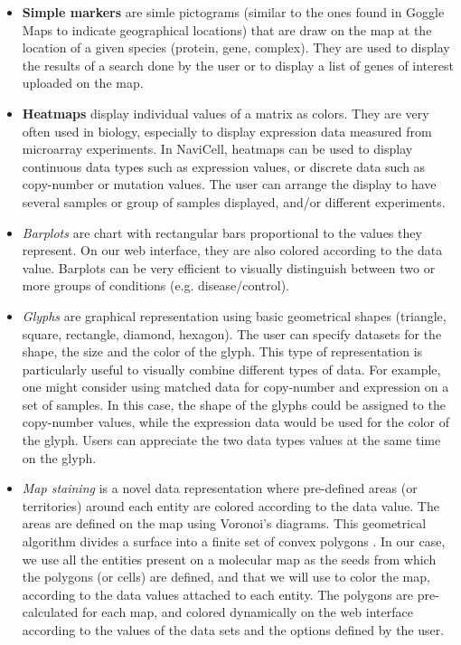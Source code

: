 \documentclass[a4,center,fleqn]{NAR}
\begin{document}
\begin{itemize}

\item \textbf{Simple markers} are simle pictograms (similar to the ones found in Goggle Maps
to indicate geographical locations) that are draw on the map at the location
of a given species (protein, gene, complex). They are used to display the
results of a search done by the user or to display a list of genes of interest
uploaded on the map.

\item \textbf{Heatmaps} display individual values of a matrix as
colors. They are very often used in biology, especially to display expression
data measured from microarray experiments. In NaviCell, heatmaps can be used to
display continuous data types such as expression values, or discrete data such
as copy-number or mutation values. The user can arrange the display to have
several samples or group of samples displayed, and/or different experiments. 

\item \emph{Barplots} are chart with rectangular bars proportional to the values
they represent. On our web interface, they are also colored according to the
data value. Barplots can be very efficient to visually distinguish between two
or more groups of conditions (e.g. disease/control).  

\item \emph{Glyphs} are graphical representation using basic geometrical shapes
(triangle, square, rectangle, diamond, hexagon). The user can specify datasets
for the shape, the size and the color of the glyph. This type of representation
is particularly useful to visually combine different types of data. For
example, one might consider using matched data for copy-number and expression
on a set of samples. In this case, the shape of the glyphs could be assigned to
the copy-number values, while the expression data would be used for the color of
the glyph. Users can appreciate the two data types values at the same time on
the glyph.

\item \emph{Map staining} is a novel data representation where pre-defined areas
(or territories) around each entity are colored according to the data value. The
areas are defined on the map using Voronoi's diagrams. This geometrical
algorithm divides a surface into a finite set of convex polygons
\cite{aurenhammer1991voronoi}. In our case, we use all the entities present on a
molecular map as the seeds from which the polygons (or cells) are defined, and
that we will use to color the map, according to the data values attached to each
entity. The polygons are pre-calculated for each map, and colored dynamically on
the web interface according to the values of the data sets and the options
defined by the user.
\end{itemize}
\end{document}
